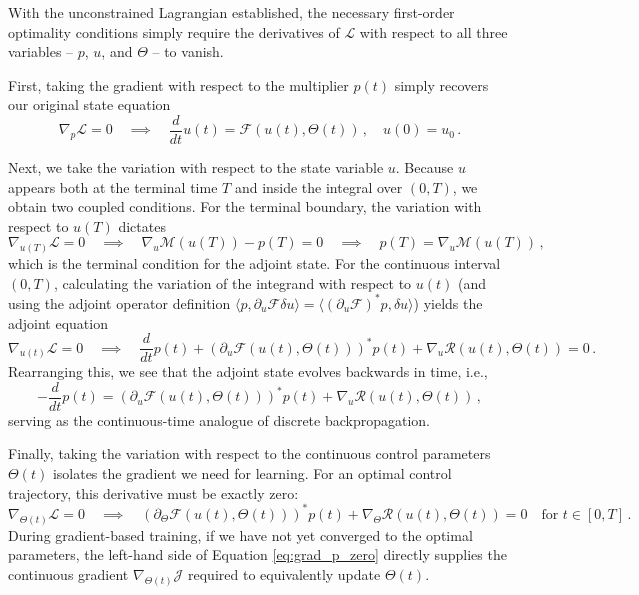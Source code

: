 With the unconstrained Lagrangian established, the necessary first-order optimality conditions simply require the derivatives of $\mathcal{L}$ with respect to all three variables -- $p$, $u$, and $\Theta$ -- to vanish. 

First, taking the gradient with respect to the multiplier $p(t)$ simply recovers our original state equation
\begin{equation*}
    \nabla_p \mathcal{L} = 0 \quad \implies \quad \frac{d}{dt}u(t) = \mathcal{F}\left(u(t), \Theta(t)\right) \, , \quad u(0) = u_0 \, .
\end{equation*}

Next, we take the variation with respect to the state variable $u$. Because $u$ appears both at the terminal time $T$ and inside the integral over $(0, T)$, we obtain two coupled conditions. For the terminal boundary, the variation with respect to $u(T)$ dictates
\begin{equation*}
    \nabla_{u(T)} \mathcal{L} = 0 \quad \implies \quad \nabla_u \mathcal{M}\left(u(T)\right) - p(T) = 0 \quad \implies \quad p(T) = \nabla_u \mathcal{M}\left(u(T)\right) \, ,
\end{equation*}
which is the terminal condition for the adjoint state. For the continuous interval $(0, T)$, calculating the variation of the integrand with respect to $u(t)$ (and using the adjoint operator definition $\langle p, \partial_u \mathcal{F} \delta u \rangle = \langle (\partial_u \mathcal{F})^* p, \delta u \rangle$) yields the adjoint equation
\begin{equation*}
    \nabla_{u(t)} \mathcal{L} = 0 \quad \implies \quad \frac{d}{dt}p(t) + \left(\partial_u \mathcal{F}(u(t), \Theta(t))\right)^* p(t) + \nabla_u \mathcal{R}\left(u(t), \Theta(t)\right) = 0 \, .
\end{equation*}
Rearranging this, we see that the adjoint state evolves backwards in time, i.e.,
\begin{equation*}
    -\frac{d}{dt} p(t) = \left(\partial_u \mathcal{F}(u(t), \Theta(t))\right)^* p(t) + \nabla_u \mathcal{R}\left(u(t), \Theta(t)\right) \, ,
\end{equation*}
serving as the continuous-time analogue of discrete backpropagation.

Finally, taking the variation with respect to the continuous control parameters $\Theta(t)$ isolates the gradient we need for learning. For an optimal control trajectory, this derivative must be exactly zero:
\begin{equation}
    \nabla_{\Theta(t)} \mathcal{L} = 0 \quad \implies \quad \left(\partial_\Theta \mathcal{F}(u(t), \Theta(t))\right)^* p(t) + \nabla_\Theta \mathcal{R}\left(u(t), \Theta(t)\right) = 0 \quad \text{for } t \in [0, T] \, .
    \label{eq:grad_p_zero}
\end{equation}
During gradient-based training, if we have not yet converged to the optimal parameters, the left-hand side of Equation \eqref{eq:grad_p_zero} directly supplies the continuous gradient $\nabla_{\Theta(t)} \mathcal{J}$ required to equivalently update $\Theta(t)$.

